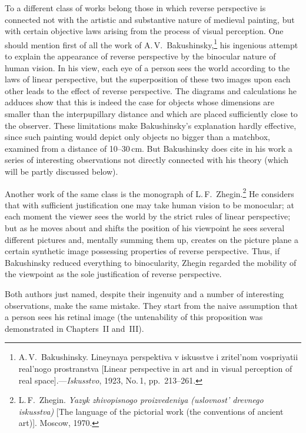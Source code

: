 To a different class of works belong those in which reverse perspective is connected
not with the artistic and substantive nature of medieval painting, but with certain
objective laws arising from the process of visual perception.  One should mention
first of all the work of A.\,V.~Bakushinsky,\footnote{A.\,V.~Bakushinsky.
  Lineynaya perspektiva v iskusstve i zritel'nom vospriyatii real'nogo prostranstva
  [Linear perspective in art and in visual perception of real space].---\emph{Iskusstvo},
  1923, No.\,1, pp.~213--261.}
his ingenious attempt to explain the appearance of reverse perspective by the
binocular nature of human vision.  In his view, each eye of a person sees the world
according to the laws of linear perspective, but the superposition of these two
images upon each other leads to the effect of reverse perspective.  The diagrams and
calculations he adduces show that this is indeed the case for objects whose
dimensions are smaller than the interpupillary distance and which are placed
sufficiently close to the observer.  These limitations make Bakushinsky's explanation
hardly effective, since such painting would depict only objects no bigger than a
matchbox, examined from a distance of 10--30\,cm.  But Bakushinsky does cite in his
work a series of interesting observations not directly connected with his theory
(which will be partly discussed below).

Another work of the same class is the monograph of L.\,F.~Zhegin.\footnote{L.\,F.~Zhegin.
  \emph{Yazyk zhivopisnogo proizvedeniya (uslovnost' drevnego iskusstva)}
  [The language of the pictorial work (the conventions of ancient art)].
  Moscow, 1970.}
He considers that with sufficient justification one may take human vision to be
monocular; at each moment the viewer sees the world by the strict rules of linear
perspective; but as he moves about and shifts the position of his viewpoint he sees
several different pictures and, mentally summing them up, creates on the picture
plane a certain synthetic image possessing properties of reverse perspective.  Thus,
if Bakushinsky reduced everything to binocularity, Zhegin regarded the mobility of
the viewpoint as the sole justification of reverse perspective.

Both authors just named, despite their ingenuity and a number of interesting
observations, make the same mistake.  They start from the naive assumption that a
person sees his retinal image (the untenability of this proposition was demonstrated
in Chapters~II and~III).


